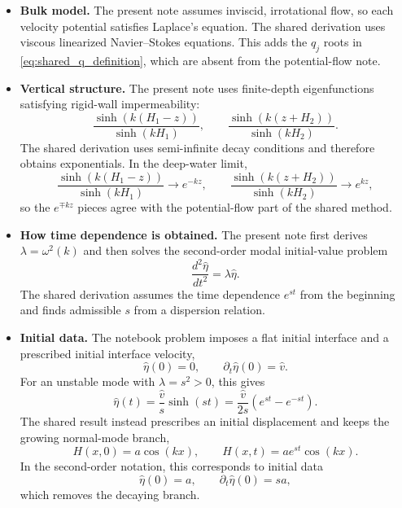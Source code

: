 \documentclass[11pt,a4paper]{article}
\begin{document}
\begin{itemize}[leftmargin=*]
    \item \textbf{Bulk model.}
    The present note assumes inviscid, irrotational flow, so each velocity potential satisfies Laplace's equation.  The shared derivation uses viscous linearized Navier--Stokes equations.  This adds the $q_j$ roots in \eqref{eq:shared_q_definition}, which are absent from the potential-flow note.

    \item \textbf{Vertical structure.}
    The present note uses finite-depth eigenfunctions satisfying rigid-wall impermeability:
    \begin{equation}
        \frac{\sinh(k(H_1-z))}{\sinh(kH_1)},
        \qquad
        \frac{\sinh(k(z+H_2))}{\sinh(kH_2)}.
    \end{equation}
    The shared derivation uses semi-infinite decay conditions and therefore obtains exponentials.  In the deep-water limit,
    \begin{equation}
        \frac{\sinh(k(H_1-z))}{\sinh(kH_1)}
        \to e^{-kz},
        \qquad
        \frac{\sinh(k(z+H_2))}{\sinh(kH_2)}
        \to e^{kz},
    \end{equation}
    so the $e^{\mp kz}$ pieces agree with the potential-flow part of the shared method.

    \item \textbf{How time dependence is obtained.}
    The present note first derives $\lambda=\omega^2(k)$ and then solves the second-order modal initial-value problem
    \begin{equation}
        \frac{d^2\widehat{\eta}}{dt^2}=\lambda\widehat{\eta}.
    \end{equation}
    The shared derivation assumes the time dependence $e^{st}$ from the beginning and finds admissible $s$ from a dispersion relation.

    \item \textbf{Initial data.}
    The notebook problem imposes a flat initial interface and a prescribed initial interface velocity,
    \begin{equation}
        \widehat{\eta}(0)=0,
        \qquad
        \partial_t\widehat{\eta}(0)=\widehat{v}.
    \end{equation}
    For an unstable mode with $\lambda=s^2>0$, this gives
    \begin{equation}
        \widehat{\eta}(t)=\frac{\widehat{v}}{s}\sinh(st)
        =
        \frac{\widehat{v}}{2s}\left(e^{st}-e^{-st}\right).
    \end{equation}
    The shared result instead prescribes an initial displacement and keeps the growing normal-mode branch,
    \begin{equation}
        H(x,0)=a\cos(kx),
        \qquad
        H(x,t)=a e^{st}\cos(kx).
    \end{equation}
    In the second-order notation, this corresponds to initial data
    \begin{equation}
        \widehat{\eta}(0)=a,
        \qquad
        \partial_t\widehat{\eta}(0)=sa,
    \end{equation}
    which removes the decaying branch.


\end{itemize}
\end{document}
